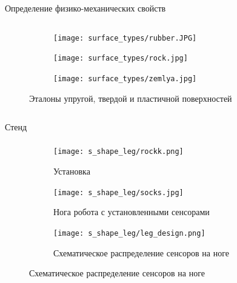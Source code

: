 \begin{frame}[t]{Определение физико-механических свойств}
\begin{columns}[T,onlytextwidth]
\begin{column}{0.54\textwidth}
\begin{figure}[H]
            \begin{subfigure}[b]{0.3\textwidth}
                \centering\texttt{[image: surface\_types/rubber.JPG]}
            \end{subfigure}
            \hfill
            \begin{subfigure}[b]{0.3\textwidth}
                \centering\texttt{[image: surface\_types/rock.jpg]}
            \end{subfigure}
            \hfill
            \begin{subfigure}[b]{0.3\textwidth}
                \centering\texttt{[image: surface\_types/zemlya.jpg]}\\
            \end{subfigure}
            \vspace{-0.3cm}
            \caption{Эталоны упругой, твердой и пластичной поверхностей}
        \end{figure}
    \end{column}
\end{columns}
\end{frame}

\begin{frame}[t]{Стенд}
    \framesubtitle{}
    \begin{figure}[H]
        \begin{subfigure}{0.33\textwidth}
            \centering\texttt{[image: s\_shape\_leg/rockk.png]}
            \caption{Установка}
        \end{subfigure}
        \begin{subfigure}{0.33\textwidth}
            \centering\texttt{[image: s\_shape\_leg/socks.jpg]}
            \caption{Нога робота с установленными сенсорами}
        \end{subfigure}
        \begin{subfigure}{0.33\textwidth}
            \centering\texttt{[image: s\_shape\_leg/leg\_design.png]}
            \caption{Схематическое распределение сенсоров на ноге}
        \end{subfigure}
    \end{figure}
\end{frame}

